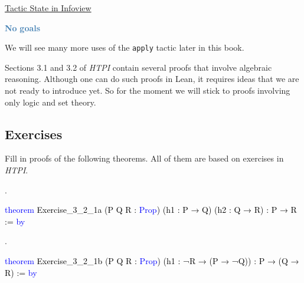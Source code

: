 \documentclass[
  letterpaper,
  DIV=11,
  numbers=noendperiod]{scrreprt}
\makeatletter
\newenvironment{Shaded}{\begin{snugshade}}{\end{snugshade}}
\newcommand{\InformationTok}[1]{\textcolor[rgb]{0.37,0.37,0.37}{#1}}
\newcommand{\KeywordTok}[1]{\textcolor[rgb]{0.00,0.23,0.31}{#1}}
\newcommand{\NormalTok}[1]{\textcolor[rgb]{0.00,0.23,0.31}{#1}}
\newcommand{\SpecialCharTok}[1]{\textcolor[rgb]{0.37,0.37,0.37}{#1}}
\newcommand{\SpecialStringTok}[1]{\textcolor[rgb]{0.13,0.47,0.30}{#1}}
\newcommand{\WarningTok}[1]{\textcolor[rgb]{0.37,0.37,0.37}{\textit{#1}}}
\def\redsquiggly{\bgroup \markoverwith{\textcolor{red}{\lower3.5\p@\hbox{\sixly \char58}}}\ULon}
\renewcommand{\NormalTok}[1]{\textcolor[HTML]{000000}{#1}}
\renewcommand{\KeywordTok}[1]{\textcolor[HTML]{0000FF}{#1}}
\renewcommand{\SpecialCharTok}[1]{}
\renewcommand{\WarningTok}[1]{\redsquiggly{\textcolor[HTML]{0000FF}{#1}}}
\renewcommand{\InformationTok}[1]{\textcolor[HTML]{D2691E}{\textbf{#1}}}
\renewcommand{\SpecialStringTok}[1]{\textcolor[HTML]{4682B4}{\textbf{#1}}}
\newcommand{\nobreakShaded}{\renewenvironment{Shaded}
	{\begin{tcolorbox}[frame hidden, enhanced, interior hidden, boxrule=0pt,
		borderline west={3pt}{0pt}{shadecolor}, sharp corners]}
	{\end{tcolorbox}}}
\newenvironment{outpt}
	{\nobreakShaded\begin{minipage}[t]{0.32\textwidth}
		\uline{Tactic State in Infoview}}
	{\end{minipage}}
\newenvironment{numex}[1]
	{\begin{minipage}[t]{0.04\textwidth}\vspace{8pt}{#1}.
		\end{minipage}\nobreakShaded\begin{minipage}[t]{0.96\textwidth}\vspace{0pt}}
	{\end{minipage}}
\theoremstyle{remark}
\makeatother
\begin{document}
\begin{outpt}

\begin{Shaded}
\begin{Highlighting}[]
\SpecialStringTok{No}\InformationTok{ }\SpecialStringTok{goals}
\end{Highlighting}
\end{Shaded}

\end{outpt}

We will see many more uses of the \texttt{apply} tactic later in this
book.

Sections 3.1 and 3.2 of \emph{HTPI} contain several proofs that involve
algebraic reasoning. Although one can do such proofs in Lean, it
requires ideas that we are not ready to introduce yet. So for the moment
we will stick to proofs involving only logic and set theory.

\hypertarget{exercises}{%
\subsection{Exercises}\label{exercises}}

Fill in proofs of the following theorems. All of them are based on
exercises in \emph{HTPI}.

\begin{numex}{1}

\begin{Shaded}
\begin{Highlighting}[]
\KeywordTok{theorem}\NormalTok{ Exercise\_3\_2\_1a (P Q R : }\KeywordTok{Prop}\NormalTok{)}
\NormalTok{    (h1 : P → Q) (h2 : Q → R) : P → R := }\KeywordTok{by}
  
  \SpecialCharTok{**}\WarningTok{done}\SpecialCharTok{::}
\end{Highlighting}
\end{Shaded}

\end{numex}

\begin{numex}{2}

\begin{Shaded}
\begin{Highlighting}[]
\KeywordTok{theorem}\NormalTok{ Exercise\_3\_2\_1b (P Q R : }\KeywordTok{Prop}\NormalTok{)}
\NormalTok{    (h1 : ¬R → (P → ¬Q)) : P → (Q → R) := }\KeywordTok{by}
  
  \SpecialCharTok{**}\WarningTok{done}\SpecialCharTok{::}
\end{Highlighting}
\end{Shaded}

\end{numex}
\end{document}
